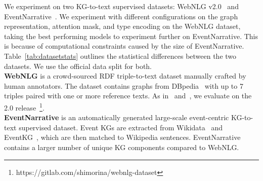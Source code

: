 \documentclass[11pt]{article}
\begin{document}
We experiment on two KG-to-text supervised datasets: WebNLG v2.0~\cite{gardent2017webnlg,shimorina2018handling} and EventNarrative~\cite{colas2021eventnarrative}. We experiment with different configurations on the graph representation, attention mask, and type encoding on the WebNLG dataset, taking the best performing models to experiment further on EventNarrative. This is because of computational constraints caused by the size of EventNarrative. Table~\ref{tab:datasetstats} outlines the statistical differences between the two datasets. We use the official data split for both. \\
\textbf{WebNLG} is a crowd-sourced RDF triple-to-text dataset manually crafted by human annotators. The dataset contains graphs from DBpedia~\cite{auer2007dbpedia} with up to 7 triples paired with one or more reference texts. 
As in~\citet{chen-etal-2020-kgpt} and~\citet{ke-etal-2021-jointgt}, we evaluate on the 2.0 release~\footnote{https://gitlab.com/shimorina/webnlg-dataset}.
\\
\textbf{EventNarrative} is an automatically generated large-scale event-centric KG-to-text supervised dataset. Event KGs are extracted from Wikidata~\cite{vrandevcic2014wikidata} and EventKG~\cite{gottschalk2018eventkg}, which are then matched to Wikipedia sentences. EventNarrative contains a larger number of unique KG components compared to WebNLG. 
\end{document}
